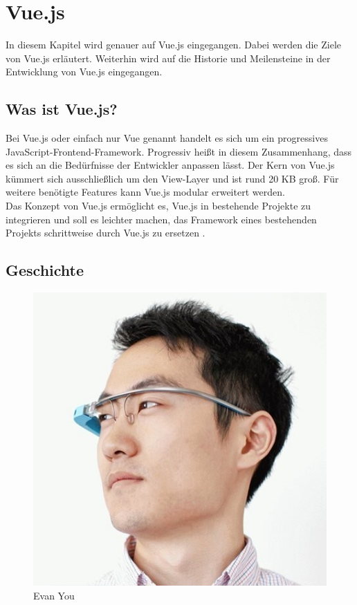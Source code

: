 %
\chapter{Vue.js}
In diesem Kapitel wird genauer auf Vue.js eingegangen.
Dabei werden die Ziele von Vue.js erläutert.
Weiterhin wird auf die Historie und Meilensteine in der Entwicklung von Vue.js eingegangen.


\section{Was ist Vue.js?}
Bei Vue.js oder einfach nur Vue genannt handelt es sich um ein progressives JavaScript-Frontend-Framework.
Progressiv heißt in diesem Zusammenhang,
dass es sich an die Bedürfnisse der Entwickler anpassen lässt.
Der Kern von Vue.js kümmert sich ausschließlich um den View-Layer und ist rund 20 KB groß.
Für weitere benötigte Features kann Vue.js modular erweitert werden. \cite[S. 523-524]{bin2019}
\\
Das Konzept von Vue.js ermöglicht es, Vue.js in bestehende Projekte zu integrieren
und soll es leichter machen, das Framework eines bestehenden Projekts
schrittweise durch Vue.js zu ersetzen \cite[S. 1]{peterke2019}.


\section{Geschichte}\label{sec:geschichte}

\begin{figure}[!htb]
    \centering
    \includegraphics[width=.2\textwidth]{img/you}
    \caption{Evan You \cite{linkedinYou}}
    \label{fig:you}
\end{figure}

